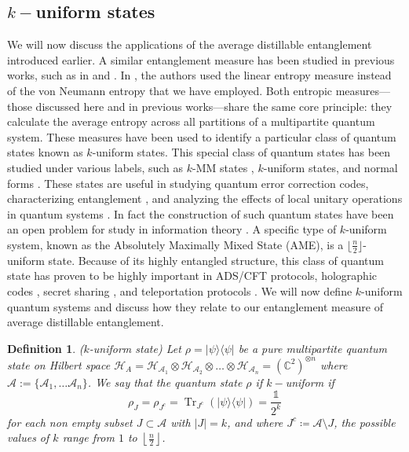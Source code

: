\documentclass{article}
\newtheorem{definition}[theorem]{Definition}
\DeclareMathOperator{\Tr}{Tr}
\newcommand{\ketbra}[2]{| #1\rangle\! \langle #2|}
\newcommand{\identity}{\mathds{1}}
\begin{document}
\subsection{$k-$uniform states}
We will now discuss the applications of the average distillable entanglement introduced earlier. A similar entanglement measure has been studied in previous works, such as in \cite{Scott_k-uniform} and \cite{meyer2001global}. In \cite{Scott_k-uniform}, the authors used the linear entropy measure instead of the von Neumann entropy that we have employed. Both entropic measures—those discussed here and in previous works—share the same core principle: they calculate the average entropy across all partitions of a multipartite quantum system. These measures have been used to identify a particular class of quantum states known as $k$-uniform states. This special class of quantum states has been studied under various labels, such as $k$-MM states \cite{Cerf_k-MM}, $k$-uniform states, and normal forms \cite{MoorNormal_form}. These states are useful in studying quantum error correction codes\cite{Scott_k-uniform}, characterizing entanglement \cite{meyer2001global}, and analyzing the effects of local unitary operations in quantum systems \cite{Kraus_LU_Equivalence}. In fact the construction of such quantum states have been an open problem for study in information theory \cite{Karol_k-uniform_construction}. A specific type of $k$-uniform system, known as the Absolutely Maximally Mixed State (AME), is a $\lfloor \frac{n}{2} \rfloor$-uniform state. Because of its highly entangled structure, this class of quantum state has proven to be highly important in ADS/CFT protocols, holographic codes \cite{preskill_holographic_codes}, secret sharing \cite{Helwig_AME}, and teleportation protocols \cite{Helwig:2013ckb}. We will now define $k$-uniform quantum systems and discuss how they relate to our entanglement measure of average distillable entanglement.

\begin{definition}
\label{def:k-uniform}
($k$-uniform state)
    Let $\rho = \ketbra{\psi}{\psi}$ be a pure multipartite quantum state on Hilbert space $\mathcal{H}_A = \mathcal{H}_{\mathcal{A}_1} \otimes \mathcal{H}_{\mathcal{A}_2} \otimes \dots \otimes \mathcal{H}_{\mathcal{A}_n} = (\mathbb{C}^2)^{\otimes n}$  where $\mathcal{A} := \{\mathcal{A}_1, \ldots \mathcal{A}_n\}$. We say that the quantum state $\rho$ if $k-$uniform if 
    \begin{equation}
        \rho_J = \rho_{J^c} = \Tr_{J^c}(\ketbra{\psi}{\psi}) = \frac{\identity}{2^k}
    \end{equation}
for each non empty subset $ J \subset \mathcal{A} $ with $ |J| = k $, and where $ J^c \coloneqq \mathcal{A} \setminus J $, the possible values of $ k $ range from $ 1 $ to $ \left\lfloor \frac{n}{2} \right\rfloor $.
\end{definition} 
\end{document}

